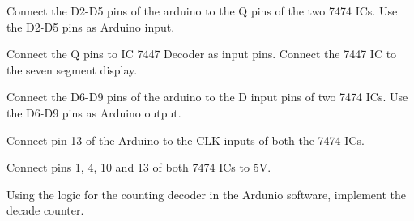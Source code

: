 %
\begin{problem}
Connect the D2-D5 pins of the arduino to the Q pins of the two 7474 ICs. Use the D2-D5 pins as Arduino input.
\end{problem}
\begin{problem}
Connect the Q pins to IC 7447 Decoder as input pins.  Connect the 7447 IC to the seven segment display.
\end{problem}
\begin{problem}
Connect the D6-D9 pins of the arduino to the D input pins of two 7474 ICs. Use the D6-D9 pins as Arduino output.
\end{problem}
\begin{problem}
Connect pin 13 of the Arduino to the CLK inputs of both the 7474 ICs.
\end{problem}
\begin{problem}
Connect pins 1, 4, 10 and 13 of both 7474 ICs to 5V.
\end{problem}
\begin{problem}
Using the logic for the counting decoder in the Ardunio software, implement the decade counter.
\end{problem}
%



